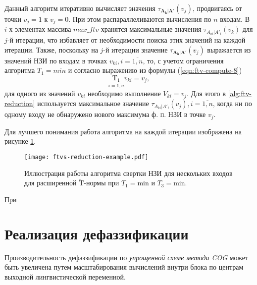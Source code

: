 Данный алгоритм итеративно вычисляет значения $\tau_{\mathbf{A_k}|\mathbf{A'}}(v_j)$, продвигаясь от точки $v_j = 1$ к $v_j = 0$. При этом распараллеливаются вычисления по $n$ входам. В $i$-х элементах массива $max\_ftv$ хранятся максимальные значения $\tau_{A_{ki}|A'_i}(v_k)$ для $j$-й итерации, что избавляет от необходимости поиска этих значений на каждой итерации. Также, поскольку на $j$-й итерации значение $\tau_{\mathbf{A_k}|\mathbf{A'}}(v_j)$ выражается из значений НЗИ по входам в точках $v_{ki}, i=\overline{1,n}$, то, с учетом ограничения алгоритма $T_1 = min$ и согласно выражению из формулы (\ref{eqn:ftv-compute-8})
\[
\underset{i=\overline{1,n}}{\mathrm{T_1}}v_{ki} = v_j,
\]
для одного из значений $v_{ki}$ необходимо выполнение $V_{ki} = v_j$. Для этого в \cref{alg:ftv-reduction} используется максимальное значение $\tau_{A_{ki}|A'_i}(v_j), i=\overline{1,n}$, когда ни по одному входу не обнаружено нового максимума ф. п. НЗИ в точке $v_j$.

Для лучшего понимания работа алгоритма на каждой итерации изображена на рисунке \cref{fig:ftvs-reduction-example}. %

\begin{figure}
    \label{fig:ftvs-reduction-example}
    \centering
    \texttt{[image: ftvs-reduction-example.pdf]}
    \caption{Иллюстрация работы алгоритма свертки НЗИ для нескольких входов для расширенной $\mathrm{\tilde{T}}$-нормы при $T_1=\mathrm{min}$ и $T_3=\mathrm{min}$.}
\end{figure}

При 



\section{Реализация дефаззификации}

Производительность дефаззификации по \textit{упрощенной схеме метода COG} может быть увеличена путем масштабирования вычислений внутри блока по центрам выходной лингвистической переменной.

